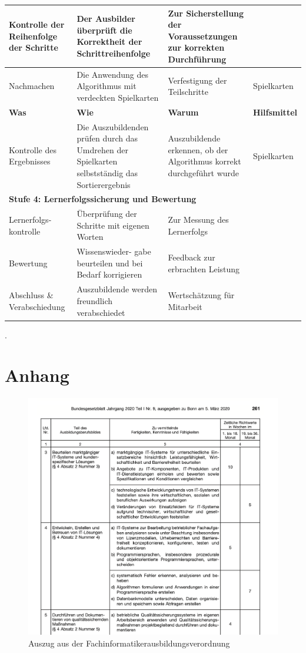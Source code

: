 \begin{longtable}{ |p{3cm}|p{3cm}|p{3cm}|p{3cm}|}
\hline
Kontrolle der Reihenfolge der Schritte & Der Ausbilder überprüft die Korrektheit der  Schrittreihenfolge & Zur Sicherstellung der Voraussetzungen zur korrekten Durchführung  & \\
 \hline
Nachmachen  & Die Anwendung des Algorithmus mit verdeckten Spielkarten & Verfestigung der Teilschritte & Spielkarten\\
 \hline
 \pagebreak
  \hline
   \textbf{Was} & \textbf{Wie} & \textbf{Warum} & \textbf{Hilfsmittel} \\
 \hline
Kontrolle des Ergebnisses  & Die Auszubildenden prüfen durch das Umdrehen der Spielkarten selbstständig das Sortierergebnis & Auszubildende erkennen, ob der Algorithmus korrekt durchgeführt wurde & Spielkarten \\
 \hline
\multicolumn{4}{|l|}{\textbf{Stufe 4: Lernerfolgssicherung und Bewertung}}  \\
\hline
Lernerfolgs- kontrolle & Überprüfung der Schritte mit eigenen Worten  & Zur Messung des Lernerfolgs & \\
 \hline
Bewertung & Wissenswieder- gabe beurteilen und bei Bedarf korrigieren & Feedback zur erbrachten Leistung & \\
 \hline
Abschluss \& Verabschiedung  &  Auszubildende werden freundlich verabschiedet & Wertschätzung für Mitarbeit & \\
\hline
\end{longtable}

.

\appendix       %

\chapter{Anhang}
\begin{figure}[H]
\centering
\includegraphics[scale=0.9]{arp}
\caption{Auszug aus der Fachinformatikerausbildungsverordnung}
\end{figure}





